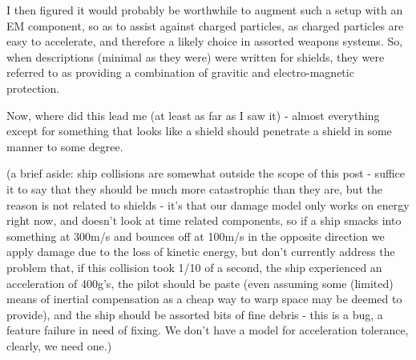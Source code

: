 I then figured it would probably be worthwhile to augment such a setup
with an EM component, so as to assist against charged particles, as
charged particles are easy to accelerate, and therefore a likely
choice in assorted weapons systems. So, when descriptions (minimal as
they were) were written for shields, they were referred to as
providing a combination of gravitic and electro-magnetic protection.

Now, where did this lead me (at least as far as I saw it) - almost
everything except for something that looks like a shield should
penetrate a shield in some manner to some degree.

(a brief aside: ship collisions are somewhat outside the scope of this
post - suffice it to say that they should be much more catastrophic
than they are, but the reason is not related to shields - it's that
our damage model only works on energy right now, and doesn't look at
time related components, so if a ship smacks into something at 300m/s
and bounces off at 100m/s in the opposite direction we apply damage
due to the loss of kinetic energy, but don't currently address the
problem that, if this collision took 1/10 of a second, the ship
experienced an acceleration of 400g's, the pilot should be paste (even
assuming some (limited) means of inertial compensation as a cheap way
to warp space may be deemed to provide), and the ship should be
assorted bits of fine debris - this is a bug, a feature failure in
need of fixing. We don't have a model for acceleration tolerance,
clearly, we need one.)


